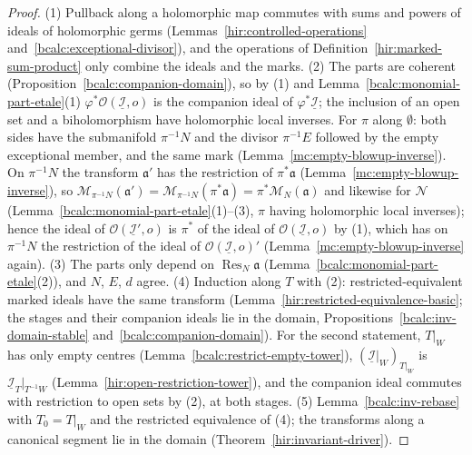 \begin{proof}
\mixedleanok
(1) Pullback along a holomorphic map commutes with sums and powers of ideals of holomorphic germs (Lemmas~\ref{hir:controlled-operations}
and~\ref{bcalc:exceptional-divisor}), and the operations of Definition~\ref{hir:marked-sum-product} only combine the ideals and the marks. (2) The parts are
coherent (Proposition~\ref{bcalc:companion-domain}), so by (1) and Lemma~\ref{bcalc:monomial-part-etale}(1)
\(\varphi^*\mathcal O(\underline{\mathcal I},o)\) is the companion ideal of \(\varphi^*\underline{\mathcal I}\); the inclusion of an open set and a biholomorphism have holomorphic local
inverses. For \(\pi\) along \(\emptyset\): both sides have the submanifold \(\pi^{-1}N\) and the divisor \(\pi^{-1}E\) followed by the empty exceptional member, and the same mark
(Lemma~\ref{mc:empty-blowup-inverse}). On \(\pi^{-1}N\) the transform \(\mathfrak a'\) has the restriction of \(\pi^*\mathfrak a\) (Lemma~\ref{mc:empty-blowup-inverse}), so
\(\mathcal M_{\pi^{-1}N}(\mathfrak a')=\mathcal M_{\pi^{-1}N}(\pi^*\mathfrak a)=\pi^*\mathcal M_N(\mathfrak a)\) and likewise for \(\mathcal N\) (Lemma~\ref{bcalc:monomial-part-etale}(1)--(3),
\(\pi\) having holomorphic local inverses); hence the ideal of \(\mathcal O(\underline{\mathcal I}',o)\) is \(\pi^*\) of the ideal of \(\mathcal O(\underline{\mathcal I},o)\) by (1), which has
on \(\pi^{-1}N\) the restriction of the ideal of \(\mathcal O(\underline{\mathcal I},o)'\) (Lemma~\ref{mc:empty-blowup-inverse} again). (3) The parts only depend on
\(\operatorname{Res}_N\mathfrak a\) (Lemma~\ref{bcalc:monomial-part-etale}(2)), and \(N\), \(E\), \(d\) agree. (4) Induction along \(T\) with (2): restricted-equivalent marked ideals have
the same transform (Lemma~\ref{hir:restricted-equivalence-basic}; the stages and their companion ideals lie in the domain, Propositions~\ref{bcalc:inv-domain-stable}
and~\ref{bcalc:companion-domain}). For the second statement, \(T|_W\) has only empty centres (Lemma~\ref{bcalc:restrict-empty-tower}), \((\underline{\mathcal I}|_W)_{T|_W}\) is
\(\underline{\mathcal I}_T|_{T^{-1}W}\) (Lemma~\ref{hir:open-restriction-tower}), and the companion ideal commutes with restriction to open sets by (2), at both stages.
(5) Lemma~\ref{bcalc:inv-rebase} with \(T_0=T|_W\) and the restricted equivalence of (4); the transforms along a canonical segment lie in the domain
(Theorem~\ref{hir:invariant-driver}).
\end{proof}

